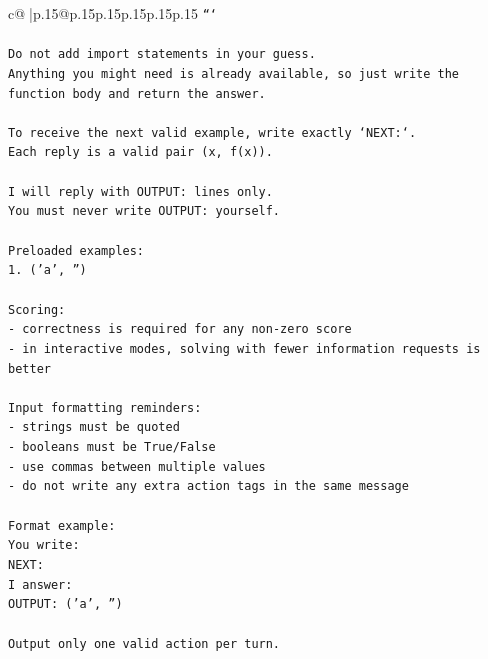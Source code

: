 \documentclass{article}
\begin{document}
{\begin{supertabular}{c@{$\;$}|p{.15\linewidth}@{}p{.15\linewidth}p{.15\linewidth}p{.15\linewidth}p{.15\linewidth}p{.15\linewidth}}
{{{\texttt{```} \\
\\ 
\texttt{Do not add import statements in your guess.} \\
\texttt{Anything you might need is already available, so just write the function body and return the answer.} \\
\\ 
\texttt{To receive the next valid example, write exactly `NEXT:`.} \\
\texttt{Each reply is a valid pair (x, f(x)).} \\
\\ 
\texttt{I will reply with OUTPUT: lines only.} \\
\texttt{You must never write OUTPUT: yourself.} \\
\\ 
\texttt{Preloaded examples:} \\
\texttt{1. ('a', '')} \\
\\ 
\texttt{Scoring:} \\
\texttt{{-} correctness is required for any non{-}zero score} \\
\texttt{{-} in interactive modes, solving with fewer information requests is better} \\
\\ 
\texttt{Input formatting reminders:} \\
\texttt{{-} strings must be quoted} \\
\texttt{{-} booleans must be True/False} \\
\texttt{{-} use commas between multiple values} \\
\texttt{{-} do not write any extra action tags in the same message} \\
\\ 
\texttt{Format example:} \\
\texttt{You write:} \\
\texttt{NEXT:} \\
\texttt{I answer:} \\
\texttt{OUTPUT: ('a', '')} \\
\\ 
\texttt{Output only one valid action per turn.} \\
            }
        }
    }
     \\ \\


\end{supertabular}}
\end{document}
